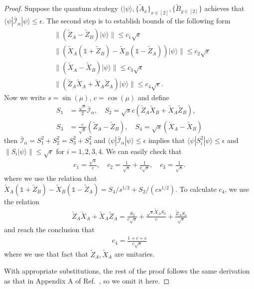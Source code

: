 \documentclass[11pt,letterpaper]{article}
\newcommand{\ket}[1]{|#1\rangle}
\newcommand{\bra}[1]{\langle#1|}
\newcommand{\1}{\mathbb{1}}
\newcommand{\I}{\mathcal{I}}
\theoremstyle{definition}
\begin{document}
\begin{proof}
Suppose the quantum strategy $(\ket{\psi}, \{\tilde{A}_x\}_{x \in [2]}, \{\tilde{B}_{y \in [2]}\}$ achieves that 
$\bra{\psi} \bar{\I}_\alpha \ket{\psi} \leq \epsilon$.
The second step is to establish bounds of the following form
\begin{align}
	&\|(\tilde{Z}_A-\tilde{Z}_B)\ket{\psi}\| \leq c_1 \sqrt{\epsilon}\\
	&\|(\tilde{X}_A(\1+\tilde{Z}_B)-\tilde{X}_B(\1-\tilde{Z}_A))\ket{\psi}\| \leq c_2 \sqrt{\epsilon}\\
	&\|(\tilde{X}_A-\tilde{X}_B)\ket{\psi}\| \leq c_3 \sqrt{\epsilon}\\
	&\|(\tilde{Z}_A\tilde{X}_A+\tilde{X}_A\tilde{Z}_A)\ket{\psi}\| \leq c_4 \sqrt{\epsilon}.
\end{align}
Now we write $s = \sin(\mu)$, $c = \cos(\mu)$ and define
\begin{align*}
	S_1 &= \frac{\sqrt{s}}{2} \bar{\I}_\alpha, \quad
	S_2 = \sqrt{s}c(\tilde{Z}_A\tilde{X}_B+\tilde{X}_A\tilde{Z}_B),\\
	S_3 &= \frac{c}{\sqrt{s}}(\tilde{Z}_A-\tilde{Z}_B),\quad
	S_4 = \sqrt{s}(\tilde{X}_A-\tilde{X}_B)
\end{align*}
then $\bar{\I}_\alpha = S_1^2 + S_2^2 = S_3^2 + S_4^2$ and $\bra{\psi}\bar{\I}_\alpha \ket{\psi} \leq \epsilon$ implies that 
$\bra{\psi}S^2_i \ket{\psi} \leq \epsilon$ and $\|S_i \ket{\psi} \| \leq \sqrt{\epsilon}$ for $i = 1,2,3,4$.
We can easily check that 
\begin{align*}
	c_1 = \frac{\sqrt{s}}{c}, \quad
	c_2 = \frac{1}{\sqrt{s}} + \frac{1}{c\sqrt{s}}, \quad
	c_3 = \frac{1}{\sqrt{s}}.
\end{align*}
where we use the relation that $\tilde{X}_A(\1+\tilde{Z}_B)-\tilde{X}_B(\1-\tilde{Z}_A) = S_4/s^{1/2} + S_2/(cs^{1/2})$.
To calculate $c_4$, we use the relation
\begin{align}
	\tilde{Z}_A\tilde{X}_A + \tilde{X}_A\tilde{Z}_A = \frac{S_2}{c\sqrt{s}} + \frac{\sqrt{s}\tilde{X}_AS_3}{c} + \frac{\tilde{Z}_AS_4}{\sqrt{s}}
\end{align}
and reach the conclusion that  
\begin{align}
	c_4 = \frac{1+c+s}{c\sqrt{s}}
\end{align}
where we use that fact that $\tilde{Z}_A, \tilde{X}_A$ are unitaries.

With appropriate substitutions, the rest of the proof follows the same derivation as that in Appendix A of Ref.~\cite{bamps2015},
so we omit it here.
\end{proof}
\end{document}
